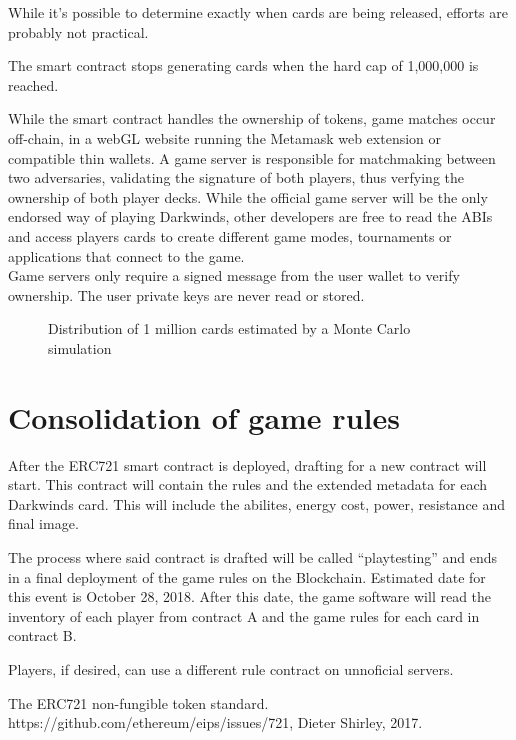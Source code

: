 \documentclass[11pt,twocolumn]{article}
\begin{document}
While it's possible to determine exactly when cards are being released, efforts are probably not practical. 

The smart contract stops generating cards when the hard cap of 1,000,000 is reached.

While the smart contract handles the ownership of tokens, game matches occur off-chain, in a webGL website running the Metamask web extension or compatible thin wallets. A game server is responsible for matchmaking between two adversaries, validating the signature of both players, thus verfying the ownership of both player decks. While the official game server will be the only endorsed way of playing Darkwinds, other developers are free to read the ABIs and access players cards to create different game modes, tournaments or applications that connect to the game.\\

Game servers only require a signed message from the user wallet to verify ownership. The user private keys are never read or stored.

\begin{figure}[!htb]
\centering 
    
\caption{Distribution of 1 million cards estimated by a Monte Carlo simulation} \label{fig:B}
\end{figure}
\section{Consolidation of game rules}
After the ERC721 smart contract is deployed, drafting for a new contract will start. This contract will contain the rules and the extended metadata for each Darkwinds card. This will include the abilites, energy cost, power, resistance and final image. 

The process where said contract is drafted will be called ``playtesting'' and ends in a final deployment of the game rules on the Blockchain. Estimated date for this event is October 28, 2018. After this date, the game software will read the inventory of each player from contract A and the game rules for each card in contract B. 

Players, if desired, can use a different rule contract on unnoficial servers.

\onecolumn

\begin{thebibliography}{1}

         The ERC721 non-fungible token standard. https://github.com/ethereum/eips/issues/721, Dieter Shirley, 2017.
      
        \end{thebibliography}
\end{document}
